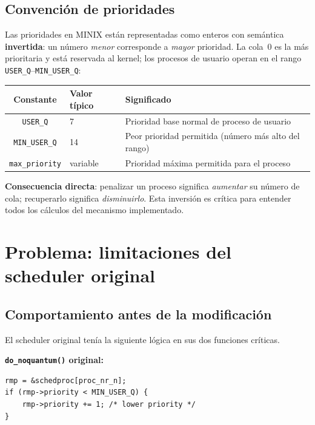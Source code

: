 \documentclass[11pt,a4paper]{article}
\begin{document}
\subsection{Convenci\'on de prioridades}

Las prioridades en MINIX est\'an representadas como enteros con sem\'antica
\textbf{invertida}: un n\'umero \emph{menor} corresponde a \emph{mayor} prioridad.
La cola~0 es la m\'as prioritaria y est\'a reservada al kernel; los procesos de usuario
operan en el rango \texttt{USER\_Q}--\texttt{MIN\_USER\_Q}:

\begin{center}
\begin{tabular}{cll}
\toprule
\textbf{Constante} & \textbf{Valor t\'ipico} & \textbf{Significado} \\
\midrule
\texttt{USER\_Q}     & 7        & Prioridad base normal de proceso de usuario \\
\texttt{MIN\_USER\_Q}& 14       & Peor prioridad permitida (n\'umero m\'as alto del rango) \\
\texttt{max\_priority}& variable & Prioridad m\'axima permitida para el proceso \\
\bottomrule
\end{tabular}
\end{center}

\medskip
\noindent\textbf{Consecuencia directa}: penalizar un proceso significa \emph{aumentar}
su n\'umero de cola; recuperarlo significa \emph{disminuirlo}. Esta inversi\'on es
cr\'itica para entender todos los c\'alculos del mecanismo implementado.

\section{Problema: limitaciones del scheduler original}

\subsection{Comportamiento antes de la modificaci\'on}

El scheduler original ten\'ia la siguiente l\'ogica en sus dos funciones cr\'iticas.

\bigskip\noindent\textbf{\texttt{do\_noquantum()} original:}
\begin{lstlisting}[style=cstyle,caption={\texttt{do\_noquantum()} antes de la modificaci\'on}]
rmp = &schedproc[proc_nr_n];
if (rmp->priority < MIN_USER_Q) {
    rmp->priority += 1; /* lower priority */
}
\end{lstlisting}
\end{document}
